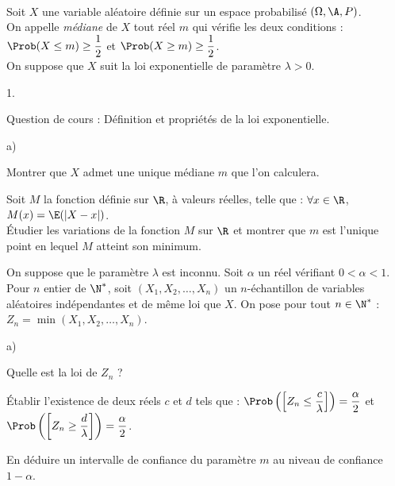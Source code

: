 \documentclass[11pt]{article}%
\begin{document}
\begin{exerciceAP}~\\
  Soit $X$ une variable aléatoire définie sur un espace probabilisé
  $(\Omega,\A,P)$.\\
  On appelle {\it médiane} de $X$ tout réel $m$ qui vérifie les deux
  conditions : $\Prob(X\leq m) \geq \dfrac{1}{2}$ et $\Prob(X\geq m)\geq
  \dfrac{1}{2}$.\\
  On suppose que $X$ suit la loi exponentielle de paramètre
  $\lambda>0$.
  \begin{noliste}{1.}
    \setlength{\itemsep}{2mm}
  \item Question de cours : Définition et propriétés de la loi exponentielle.
  \item 
    \begin{noliste}{a)}
    \setlength{\itemsep}{2mm}
    \item Montrer que $X$ admet une unique médiane $m$ que l'on
      calculera.
    \item Soit $M$ la fonction définie sur $\R$, à valeurs réelles,
      telle que : $\forall x\in\R$, $M(x)=\E(\vert X-x\vert)$.\\
      Étudier les variations de la fonction $M$ sur $\R$ et montrer
      que $m$ est l'unique point en lequel $M$ atteint son minimum.
    \end{noliste}
  \item On suppose que le paramètre $\lambda$ est inconnu. Soit
    $\alpha$ un réel vérifiant $0<\alpha<1$.\\
    Pour $n$ entier de $\N^*$, soit $(X_1,X_2,\hdots,X_n)$ un
    $n$-échantillon de variables aléatoires indépendantes et de même
    loi que $X$. On pose pour tout $n\in\N^*$ :
    $Z_n=\min(X_1,X_2,\hdots,X_n)$.
    \begin{noliste}{a)}
    \setlength{\itemsep}{2mm}
    \item Quelle est la loi de $Z_n$ ?
    \item Établir l'existence de deux réels $c$ et $d$ tels que :
      $\Prob\left(\left[ Z_n \leq \dfrac{c}{\lambda}\right]\right) =
      \dfrac{\alpha}{2}$ et $\Prob\left(\left[ Z_n \geq
          \dfrac{d}{\lambda}\right]\right)=\dfrac{\alpha}{2}$.
    \item En déduire un intervalle de confiance du paramètre $m$ au
      niveau de confiance $1-\alpha$.
    \end{noliste}
  \end{noliste}
\end{exerciceAP}
\end{document}
